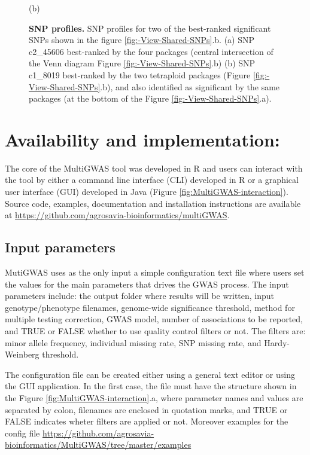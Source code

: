 \documentclass{article}
\begin{document}
\begin{figure}[H]
\begin{minipage}[t]{1\columnwidth}
\begin{minipage}[t]{0.5\columnwidth}
\begin{center}
(b)
\par\end{center}%
\end{minipage}%
\end{minipage}

\caption{\textbf{\scriptsize{}SNP profiles. }{\scriptsize{}SNP profiles for two of the best-ranked significant SNPs shown in the figure \ref{fig:-View-Shared-SNPs}.b. (a) SNP c2\_45606 best-ranked by the four packages (central intersection of the Venn diagram Figure \ref{fig:-View-Shared-SNPs}.b) (b) SNP c1\_8019 best-ranked by the two tetraploid packages (Figure \ref{fig:-View-Shared-SNPs}.b), and also identified as significant by the same packages (at the bottom of the Figure \ref{fig:-View-Shared-SNPs}.a). \label{fig:SNP-profiles}}}
\end{figure}



\section{Availability and implementation:} 
The core of the MultiGWAS tool was developed in R and users can interact with the tool by either a command line interface (CLI) developed in R or a graphical user interface (GUI) developed in Java (Figure \ref{fig:MultiGWAS-interaction}). Source code, examples, documentation and installation instructions are available at \href{https://github.com/agrosavia-bioinformatics/multiGWAS}{https://github.com/agrosavia-bioinformatics/multiGWAS}. 

\subsection{Input parameters}
MutiGWAS uses as the only input a simple configuration text file where users set the values for the main parameters that drives the GWAS process. The input parameters include: the output folder where results will be written, input genotype/phenotype filenames, genome-wide significance threshold, method for multiple testing correction, GWAS model, number of associations to be reported, and TRUE or FALSE whether to use quality control filters or not. The filters are: minor allele frequency, individual missing rate, SNP missing rate, and Hardy-Weinberg threshold.

The configuration file can be created either using a general text editor or using the GUI application. In the first case, the file must have the structure shown in the Figure \ref{fig:MultiGWAS-interaction}.a, where parameter names and values are separated by colon, filenames are enclosed in quotation marks, and TRUE or FALSE indicates wheter filters are applied or not. Moreover examples for the config file \href{https://github.com/agrosavia-bioinformatics/MultiGWAS/tree/master/examples}{https://github.com/agrosavia-bioinformatics/MultiGWAS/tree/master/examples}
\end{document}
